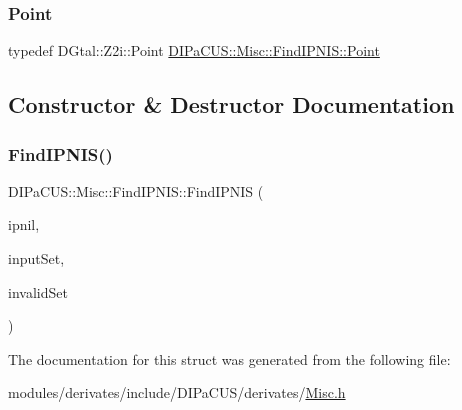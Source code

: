 \subsubsection{\texorpdfstring{Point}{Point}}
{\footnotesize\ttfamily typedef D\+Gtal\+::\+Z2i\+::\+Point \mbox{\hyperlink{structDIPaCUS_1_1Misc_1_1FindIPNIS_af4506f1e1704bc3ee542ee3000694ee1}{D\+I\+Pa\+C\+U\+S\+::\+Misc\+::\+Find\+I\+P\+N\+I\+S\+::\+Point}}}



\subsection{Constructor \& Destructor Documentation}
\mbox{\label{structDIPaCUS_1_1Misc_1_1FindIPNIS_a2a14b039bc1efdc8adfa4285d8b65972}} 
\subsubsection{\texorpdfstring{Find\+I\+P\+N\+I\+S()}{FindIPNIS()}}
{\footnotesize\ttfamily D\+I\+Pa\+C\+U\+S\+::\+Misc\+::\+Find\+I\+P\+N\+I\+S\+::\+Find\+I\+P\+N\+IS (\begin{DoxyParamCaption}\item[{\mbox{\hyperlink{structDIPaCUS_1_1Misc_1_1FindIPNIS_af4506f1e1704bc3ee542ee3000694ee1}{Point}} \&}]{ipnil,  }\item[{const \mbox{\hyperlink{structDIPaCUS_1_1Misc_1_1FindIPNIS_aa92a8a962ef5fb194297977646f84dc4}{Digital\+Set}} \&}]{input\+Set,  }\item[{const \mbox{\hyperlink{structDIPaCUS_1_1Misc_1_1FindIPNIS_aa92a8a962ef5fb194297977646f84dc4}{Digital\+Set}} \&}]{invalid\+Set }\end{DoxyParamCaption})}



The documentation for this struct was generated from the following file\+:\begin{DoxyCompactItemize}
\item 
modules/derivates/include/\+D\+I\+Pa\+C\+U\+S/derivates/\mbox{\hyperlink{Misc_8h}{Misc.\+h}}\end{DoxyCompactItemize}
